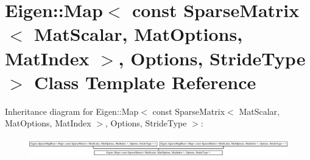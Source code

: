 \hypertarget{class_eigen_1_1_map_3_01const_01_sparse_matrix_3_01_mat_scalar_00_01_mat_options_00_01_mat_index4032bba20cf92aab8bcf07e926e15a4f}{}\section{Eigen\+:\+:Map$<$ const Sparse\+Matrix$<$ Mat\+Scalar, Mat\+Options, Mat\+Index $>$, Options, Stride\+Type $>$ Class Template Reference}
\label{class_eigen_1_1_map_3_01const_01_sparse_matrix_3_01_mat_scalar_00_01_mat_options_00_01_mat_index4032bba20cf92aab8bcf07e926e15a4f}
Inheritance diagram for Eigen\+:\+:Map$<$ const Sparse\+Matrix$<$ Mat\+Scalar, Mat\+Options, Mat\+Index $>$, Options, Stride\+Type $>$\+:\begin{figure}[H]
\begin{center}
\leavevmode
\includegraphics[height=0.834575cm]{class_eigen_1_1_map_3_01const_01_sparse_matrix_3_01_mat_scalar_00_01_mat_options_00_01_mat_index4032bba20cf92aab8bcf07e926e15a4f}
\end{center}
\end{figure}
